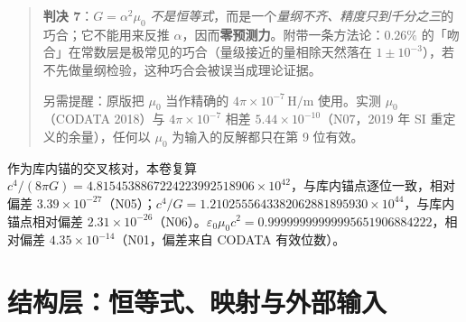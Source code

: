 \documentclass[UTF8,fontset=fandol,11pt]{ctexart}
\begin{document}
\begin{quote}
\textbf{判决 7}：$G=\alpha^2\mu_0$ \emph{不是恒等式}，而是一个\emph{量纲不齐、精度只到千分之三}的巧合；它不能用来反推 $\alpha$，因而\textbf{零预测力}。附带一条方法论：$0.26\%$ 的「吻合」在常数层是极常见的巧合（量级接近的量相除天然落在 $1\pm10^{-3}$），若不先做量纲检验，这种巧合会被误当成理论证据。

另需提醒：原版把 $\mu_0$ 当作精确的 $4\pi\times10^{-7}\,\mathrm{H/m}$ 使用。实测 $\mu_0$（CODATA 2018）与 $4\pi\times10^{-7}$ 相差 $5.44\times10^{-10}$（N07，2019 年 SI 重定义的余量），任何以 $\mu_0$ 为输入的反解都只在第 9 位有效。
\end{quote}

作为库内锚的交叉核对，本卷复算 $c^4/(8\pi G)=4.8154538867224223992518906\times10^{42}$，与库内锚点逐位一致，相对偏差 $3.39\times10^{-27}$（N05）；$c^4/G=1.2102555643382062881895930\times10^{44}$，与库内锚点相对偏差 $2.31\times10^{-26}$（N06）。$\varepsilon_0\mu_0c^2=0.99999999999995651906884222$，相对偏差 $4.35\times10^{-14}$（N01，偏差来自 CODATA 有效位数）。

\section{结构层：恒等式、映射与外部输入}
\label{sec:struct}
\end{document}
